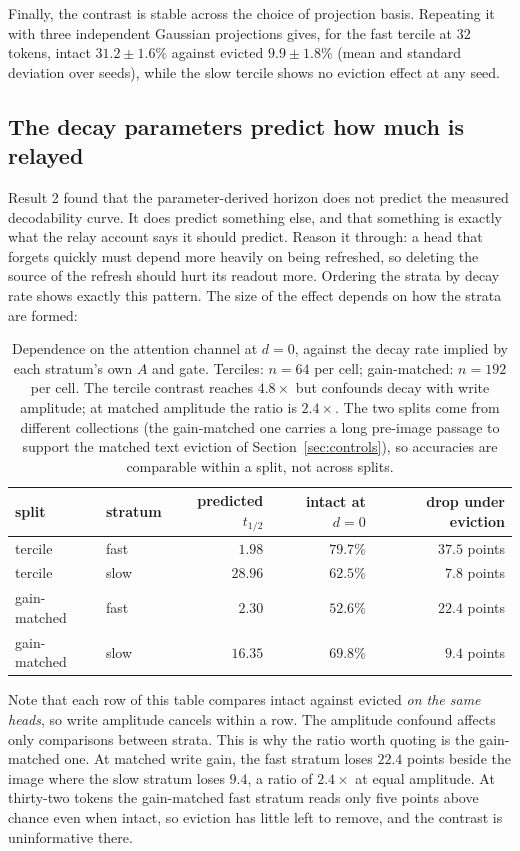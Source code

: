 \documentclass{article}
\begin{document}
Finally, the contrast is stable across the choice of projection basis. Repeating
it with three independent Gaussian projections gives, for the fast tercile at
$32$ tokens, intact $31.2 \pm 1.6\%$ against evicted $9.9 \pm 1.8\%$ (mean and
standard deviation over seeds), while the slow tercile shows no eviction effect
at any seed.

\subsection{The decay parameters predict how much is relayed}

Result 2 found that the parameter-derived horizon does not predict the
measured decodability curve. It does predict something else, and that
something is exactly what the relay account says it should predict. Reason it
through: a head that forgets quickly must depend more heavily on being
refreshed, so deleting the source of the refresh should hurt its readout
more. Ordering the strata by decay rate shows exactly this pattern. The size
of the effect depends on how the strata are formed:

\begin{table}[h]
\centering\small
\begin{tabular}{llrrr}
\toprule
split & stratum & predicted $t_{1/2}$ & intact at $d{=}0$ & drop under eviction \\
\midrule
tercile      & fast & $1.98$  & $79.7\%$ & $37.5$ points \\
tercile      & slow & $28.96$ & $62.5\%$ & $7.8$ points \\
\addlinespace
gain-matched & fast & $2.30$  & $52.6\%$ & $22.4$ points \\
gain-matched & slow & $16.35$ & $69.8\%$ & $9.4$ points \\
\bottomrule
\end{tabular}
\caption{Dependence on the attention channel at $d{=}0$, against the decay
rate implied by each stratum's own $A$ and gate. Terciles: $n = 64$ per cell;
gain-matched: $n = 192$ per cell. The tercile contrast reaches $4.8\times$ but
confounds decay with write amplitude; at matched amplitude the ratio is
$2.4\times$. The two splits come from different collections (the gain-matched
one carries a long pre-image passage to support the matched text eviction of
Section~\ref{sec:controls}), so accuracies are comparable within a split, not
across splits.}
\label{tab:dose}
\end{table}

Note that each row of this table compares intact against evicted \emph{on the
same heads}, so write amplitude cancels within a row. The amplitude confound
affects only comparisons between strata. This is why the ratio worth quoting
is the gain-matched one. At matched write gain, the fast stratum loses $22.4$
points beside the image where the slow stratum loses $9.4$, a ratio of
$2.4\times$ at equal amplitude. At thirty-two tokens the gain-matched fast
stratum reads only five points above chance even when intact, so eviction has
little left to remove, and the contrast is uninformative there.
\end{document}
